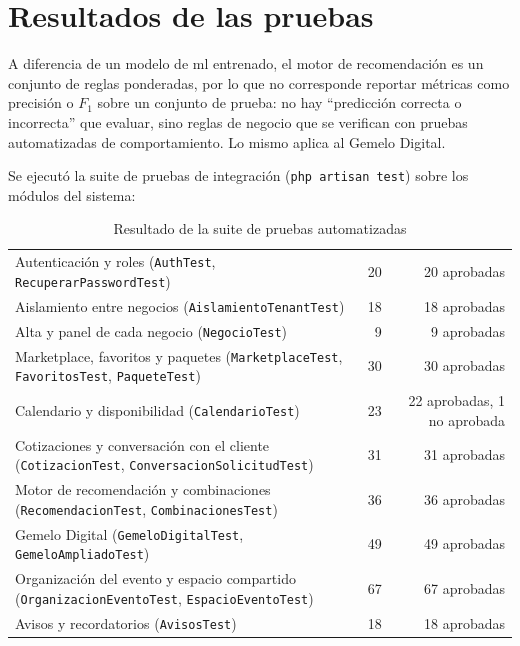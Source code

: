 \section{Resultados de las pruebas}\label{sec:pruebas}

A diferencia de un modelo de \gls{ml} entrenado, el motor de
recomendación es un conjunto de reglas
ponderadas, por lo que no corresponde reportar métricas como precisión o
$F_1$ sobre un conjunto de prueba: no hay ``predicción correcta o
incorrecta'' que evaluar, sino reglas de negocio que se verifican con
pruebas automatizadas de comportamiento. Lo mismo aplica al Gemelo
Digital.

Se ejecutó la suite de pruebas de integración
(\texttt{php artisan test}) sobre los módulos del sistema:

\begin{table}[H]
    \centering
    \caption{Resultado de la suite de pruebas automatizadas}
    \label{tab:tests}
    \small
    \begin{tabularx}{\textwidth}{L r r}
        \toprule
         &  &  \\
        \midrule
        Autenticación y roles (\texttt{AuthTest}, \texttt{RecuperarPasswordTest}) & 20 & 20 aprobadas \\
        Aislamiento entre negocios (\texttt{AislamientoTenantTest}) & 18 & 18 aprobadas \\
        Alta y panel de cada negocio (\texttt{NegocioTest}) & 9 & 9 aprobadas \\
        Marketplace, favoritos y paquetes (\texttt{MarketplaceTest}, \texttt{FavoritosTest}, \texttt{PaqueteTest}) & 30 & 30 aprobadas \\
        Calendario y disponibilidad (\texttt{CalendarioTest}) & 23 & 22 aprobadas, 1 no aprobada \\
        Cotizaciones y conversación con el cliente (\texttt{CotizacionTest}, \texttt{ConversacionSolicitudTest}) & 31 & 31 aprobadas \\
        Motor de recomendación y combinaciones (\texttt{RecomendacionTest}, \texttt{CombinacionesTest}) & 36 & 36 aprobadas \\
        Gemelo Digital (\texttt{GemeloDigitalTest}, \texttt{GemeloAmpliadoTest}) & 49 & 49 aprobadas \\
        Organización del evento y espacio compartido (\texttt{OrganizacionEventoTest}, \texttt{EspacioEventoTest}) & 67 & 67 aprobadas \\
        Avisos y recordatorios (\texttt{AvisosTest}) & 18 & 18 aprobadas \\

\end{tabularx}
\end{table}
